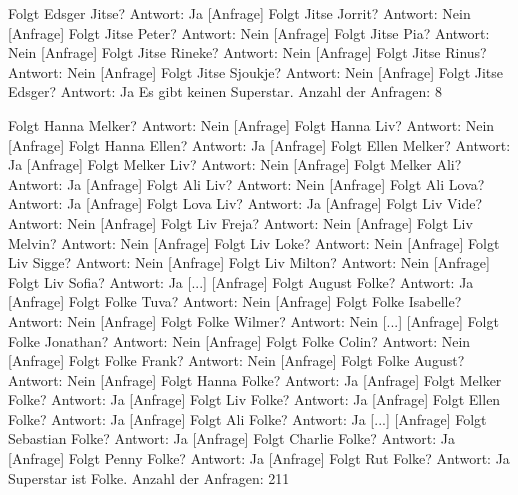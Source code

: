\documentclass[a4paper, notitlepage, 12pt]{scrartcl}
\begin{document}
  \begin{MyVerbatim}
[Anfrage] Folgt Edsger Jitse? Antwort: Ja
[Anfrage] Folgt Jitse Jorrit? Antwort: Nein
[Anfrage] Folgt Jitse Peter? Antwort: Nein
[Anfrage] Folgt Jitse Pia? Antwort: Nein
[Anfrage] Folgt Jitse Rineke? Antwort: Nein
[Anfrage] Folgt Jitse Rinus? Antwort: Nein
[Anfrage] Folgt Jitse Sjoukje? Antwort: Nein
[Anfrage] Folgt Jitse Edsger? Antwort: Ja
Es gibt keinen Superstar.
Anzahl der Anfragen: 8
  \end{MyVerbatim}


\begin{MyVerbatim}
[Anfrage] Folgt Hanna Melker? Antwort: Nein
[Anfrage] Folgt Hanna Liv? Antwort: Nein
[Anfrage] Folgt Hanna Ellen? Antwort: Ja
[Anfrage] Folgt Ellen Melker? Antwort: Ja
[Anfrage] Folgt Melker Liv? Antwort: Nein
[Anfrage] Folgt Melker Ali? Antwort: Ja
[Anfrage] Folgt Ali Liv? Antwort: Nein
[Anfrage] Folgt Ali Lova? Antwort: Ja
[Anfrage] Folgt Lova Liv? Antwort: Ja
[Anfrage] Folgt Liv Vide? Antwort: Nein
[Anfrage] Folgt Liv Freja? Antwort: Nein
[Anfrage] Folgt Liv Melvin? Antwort: Nein
[Anfrage] Folgt Liv Loke? Antwort: Nein
[Anfrage] Folgt Liv Sigge? Antwort: Nein
[Anfrage] Folgt Liv Milton? Antwort: Nein
[Anfrage] Folgt Liv Sofia? Antwort: Ja
[...]
[Anfrage] Folgt August Folke? Antwort: Ja
[Anfrage] Folgt Folke Tuva? Antwort: Nein
[Anfrage] Folgt Folke Isabelle? Antwort: Nein
[Anfrage] Folgt Folke Wilmer? Antwort: Nein
[...]
[Anfrage] Folgt Folke Jonathan? Antwort: Nein
[Anfrage] Folgt Folke Colin? Antwort: Nein
[Anfrage] Folgt Folke Frank? Antwort: Nein
[Anfrage] Folgt Folke August? Antwort: Nein
[Anfrage] Folgt Hanna Folke? Antwort: Ja
[Anfrage] Folgt Melker Folke? Antwort: Ja
[Anfrage] Folgt Liv Folke? Antwort: Ja
[Anfrage] Folgt Ellen Folke? Antwort: Ja
[Anfrage] Folgt Ali Folke? Antwort: Ja
[...]
[Anfrage] Folgt Sebastian Folke? Antwort: Ja
[Anfrage] Folgt Charlie Folke? Antwort: Ja
[Anfrage] Folgt Penny Folke? Antwort: Ja
[Anfrage] Folgt Rut Folke? Antwort: Ja
Superstar ist Folke.
Anzahl der Anfragen: 211
\end{MyVerbatim}
\end{document}
